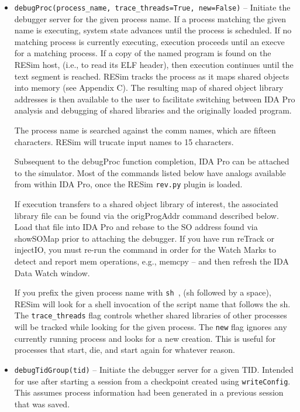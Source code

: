 \documentclass[titlepage]{article}
\begin{document}
\begin{itemize}

\item {\tt debugProc(process\_name, trace\_threads=True, new=False)} – Initiate the debugger server for the given process name.  If a process matching the given name is executing, system state advances until the process is scheduled.  If no matching process is currently executing, execution proceeds until an execve for a matching process.   If a copy of the named program is found on the RESim host, (i.e., to read its ELF header), then execution continues until the text segment is reached.  RESim tracks the process as it maps shared objects into memory (see Appendix C).  The resulting map of shared object library addresses is then available to the user to facilitate switching between IDA Pro analysis and debugging of shared libraries and the originally loaded program.

The process name is searched against the comm names, which are fifteen characters.  RESim will trucate input names to 15 characters.
                                                               

Subsequent to the debugProc  function completion, IDA Pro can be attached to the simulator.  Most of the commands listed below have analogs available from within IDA Pro, once the RESim {\tt rev.py} plugin is loaded.

If execution transfers to a shared object library of interest, the associated library file can be found via the origProgAddr command described below.  Load that file into IDA Pro and rebase to the SO address
found via showSOMap prior to attaching the debugger.  If you have run reTrack or injectIO, you must re-run the command in order for the Watch Marks to 
detect and report mem operations, e.g., memcpy -- and then refresh the IDA Data Watch window. 

If you prefix the given process name with {\tt sh }, (sh followed by a space), RESim will look for a shell invocation of the script name that follows the sh.
The {\tt trace\_threads} flag controls whether shared libraries of other processes will be tracked while looking for the given process.  The {\tt new} flag ignores any currently 
running process and looks for a new creation.  This is useful for processes that start, die, and start again for whatever reason.

\item {\tt debugTidGroup(tid)} -- Initiate the debugger server for a given TID.  Intended for use after starting a session from a checkpoint created using
{\tt writeConfig}.  This assumes process information had been generated in a previous session that was saved.  


\end{itemize}
\end{document}
